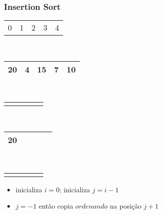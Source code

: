 \documentclass{beamer}
\begin{document}
\begin{frame}
    \frametitle{Insertion Sort}
    \begin{center}
        \begin{table}
            \begin{tabular}{p{0.25cm} p{0.25cm} p{0.25cm} p{0.25cm} p{0.25cm}}
                0 & 1 & 2 & 3 & 4
            \end{tabular} \\
            \begin{tabular}{| p{0.25cm} | p{0.25cm} | p{0.25cm} | p{0.25cm} | p{0.25cm} |}
                \hline
                20 & 4 & 15 & 7 & 10 \\ \hline
            \end{tabular} \\
            \begin{tabular}{p{0.25cm} p{0.25cm} p{0.25cm} p{0.25cm} p{0.25cm}}
                \color{green}{$\uparrow$} & & & &
            \end{tabular} \\
            \begin{tabular}{| p{0.25cm} | p{0.25cm} | p{0.25cm} | p{0.25cm} | p{0.25cm} |}
                \hline
                20 & & & & \\ \hline
            \end{tabular} \\
            \begin{tabular}{p{0.25cm} p{0.25cm} p{0.25cm} p{0.25cm} p{0.25cm}}
                \color{red}{$\uparrow$} & & & &
            \end{tabular}
        \end{table}
	\end{center}
    \color{green}{$ordenando = 20$}
    \begin{itemize}[<+->]
        \item inicializa $i = 0$; inicializa $j = i -1$
        \item $j = -1$ então copia $ordenando$ na posição $j + 1$
     \end{itemize}
\end{frame}
\end{document}
